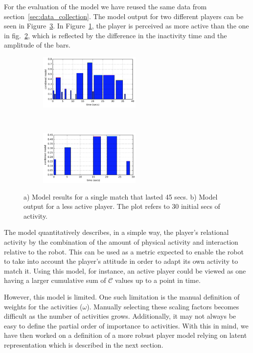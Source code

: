 For the evaluation of the model we have reused the same data from section~\ref{sec:data_collection}. The model output for two different players can be seen in Figure~\ref{fig:model_output}. In Figure~\ref{fig:fun}, the player is perceived as more active than the one in fig.~\ref{fig:nofun}, which is reflected by the difference in the inactivity time and the amplitude of the bars.

\begin{figure}[h]
    \centering 
	\begin{subfigure}[h]{5cm}
		\centering      
		\includegraphics[width=5cm]{images/04-activity/combined.png}
		\caption{}
		\label{fig:fun}
	\end{subfigure}
	~
	\begin{subfigure}[h]{5cm}
		\centering      
      	\includegraphics[width=5cm]{images/04-activity/combined_less.png}
      	\caption{}
      	\label{fig:nofun}
     \end{subfigure}
      \caption{a) Model results for a single match that lasted 45 secs. b) Model output for a less active player. The plot refers to 30 initial secs of activity.}		
      \label{fig:model_output}
\end{figure}

The model quantitatively describes, in a simple way, the player's relational activity by the combination of the amount of physical activity and interaction relative to the robot. This can be used as a metric expected to enable the robot to take into account the player's attitude in order to adapt its own activity to match it. Using this model, for instance, an active player could be viewed as one having a larger cumulative sum of $\mathcal{C}$ values up to a point in time.

However, this model is limited. %
One such limitation is the manual definition of weights for the activities ($\omega$). Manually selecting these scaling factors becomes difficult as the number of activities grows. Additionally, it may not always be easy to define the partial order of importance to activities. With this in mind, we have then worked on a definition of a more robust player model relying on latent representation which is described in the next section.

